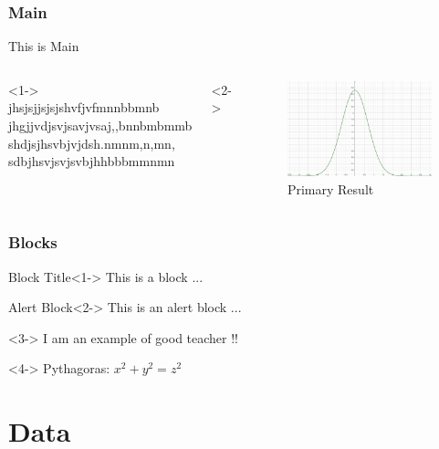\documentclass{beamer}
\begin{document}
\begin{frame}\frametitle{Main}\label{main}
This is Main
\begin{columns}
<1->
jhsjsjjsjsjshvfjvfmnnbbmnb
jhgjjvdjsvjsavjvsaj,,bnnbmbmmb
shdjsjhsvbjvjdsh.nmnm,n,mn,
sdbjhsvjsvjsvbjhhbbbmmnmn 

<2->
\begin{figure}
\centering
\includegraphics[scale=0.8]{plot0}
\caption{Primary Result}
\end{figure}
\end{columns}
\end{frame}

\begin{frame}\frametitle{Blocks}
\begin{block}{Block Title}<1->
This is a block ...
\end{block}

\begin{alertblock}{Alert Block}<2->
This is an alert block ...
\end{alertblock}

\begin{example}<3->
I am an example of good teacher !!
\end{example}

\begin{definition}<4->
Pythagoras: $x^2+y^2=z^2$
\end{definition}
\end{frame}

\section{Data}
\end{document}
